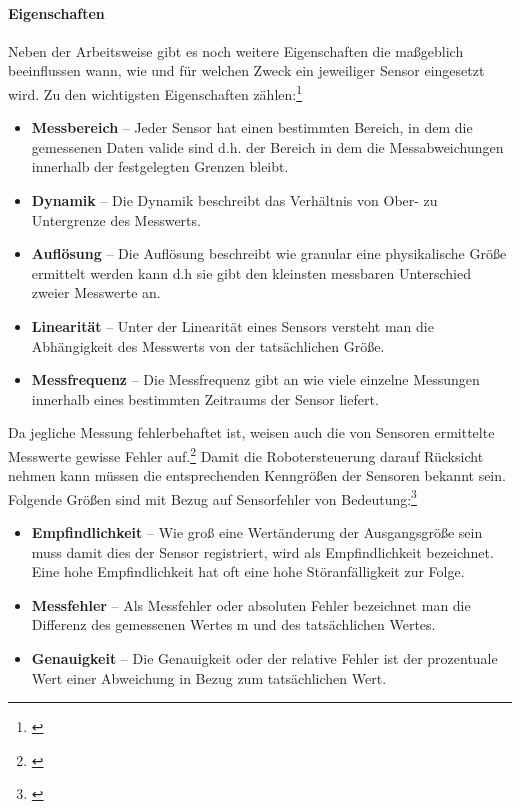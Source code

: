 \paragraph{Eigenschaften}
Neben der Arbeitsweise gibt es noch weitere Eigenschaften die maßgeblich beeinflussen wann, wie und für welchen Zweck ein jeweiliger Sensor eingesetzt wird. Zu den wichtigsten Eigenschaften zählen:\footnote{\citep[vgl.][Mobile Roboter, Seite 26 f.]{Hertzberg.MobileRoboter}\label{note7}}
\begin{itemize}
	\item{\textbf{Messbereich}} -- Jeder Sensor hat einen bestimmten Bereich, in dem die gemessenen Daten valide sind d.h. der Bereich in dem die Messabweichungen innerhalb der festgelegten Grenzen bleibt.
	\item{\textbf{Dynamik}} -- Die Dynamik beschreibt das Verhältnis von Ober- zu Untergrenze des Messwerts.
	\item{\textbf{Auflösung}} -- Die Auflösung beschreibt wie granular eine physikalische Größe ermittelt werden kann d.h sie gibt den kleinsten messbaren Unterschied zweier Messwerte an.
	\item{\textbf{Linearität}} -- Unter der Linearität eines Sensors versteht man die Abhängigkeit des Messwerts von der tatsächlichen Größe.
	\item{\textbf{Messfrequenz}} -- Die Messfrequenz gibt an wie viele einzelne Messungen innerhalb eines bestimmten Zeitraums der Sensor liefert.
\end{itemize}
Da jegliche Messung fehlerbehaftet ist, weisen auch die von Sensoren ermittelte Messwerte gewisse Fehler auf.\footnote{\citep[vgl.][Mobile Roboter, Seite 27]{Hertzberg.MobileRoboter}\label{note8}}
\newline
Damit die Robotersteuerung darauf Rücksicht nehmen kann müssen die entsprechenden Kenngrößen der Sensoren bekannt sein. Folgende Größen sind mit Bezug auf Sensorfehler von Bedeutung:\footnote{\citep[vgl.][Mobile Roboter, Seite 27 f.]{Hertzberg.MobileRoboter}\label{note9}}
\begin{itemize}
	\item{\textbf{Empfindlichkeit}} -- Wie groß eine Wertänderung der Ausgangsgröße sein muss damit dies der Sensor registriert, wird als Empfindlichkeit bezeichnet. Eine hohe Empfindlichkeit hat oft eine hohe Störanfälligkeit zur Folge.
	\item{\textbf{Messfehler}} -- Als Messfehler oder absoluten Fehler bezeichnet man die Differenz des gemessenen Wertes m und des tatsächlichen Wertes.
	\item{\textbf{Genauigkeit}} -- Die Genauigkeit oder der relative Fehler ist der prozentuale	Wert einer Abweichung in Bezug zum tatsächlichen Wert.
\end{itemize}
